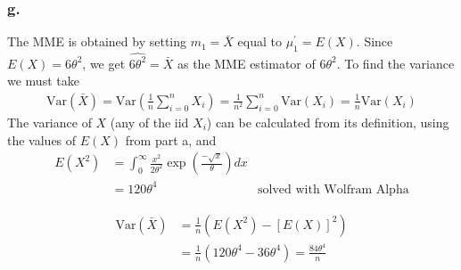 \documentclass{article}
\begin{document}
\subsubsection*{g.}
The MME is obtained by setting $m_1=\bar{X}$ equal to $\mu_1^\prime = E(X)$. Since $E(X) = 6\theta^2$, we get $\widehat{6\theta^2} = \bar{X}$ as the MME estimator of $6\theta^2$. To find the variance we must take 
\begin{align*}
\mathrm{Var}(\bar{X}) = \mathrm{Var}\left(\frac{1}{n}\sum_{i=0}^n X_i\right) = \frac{1}{n^2}\sum_{i=0}^n \mathrm{Var}(X_i) = \frac{1}{n}\mathrm{Var}(X_i)
\end{align*}
The variance of $X$ (any of the iid $X_i$) can be calculated from its definition, using the values of $E(X)$ from part a, and
\begin{align*}
E(X^2) &= \int_0^\infty \frac{x^2}{2\theta^2}\exp\left(\frac{-\sqrt{x}}{\theta}\right)dx \\
&=120\theta^4 &\text{solved with Wolfram Alpha}
\end{align*}

\begin{align*}
\mathrm{Var}(\bar{X}) &= \frac{1}{n}\left(E(X^2) - \left[E(X)\right]^2\right) \\
&=\frac{1}{n}\left(120\theta^4-36\theta^4\right) = \frac{84\theta^4}{n} \\
\end{align*}
\end{document}
